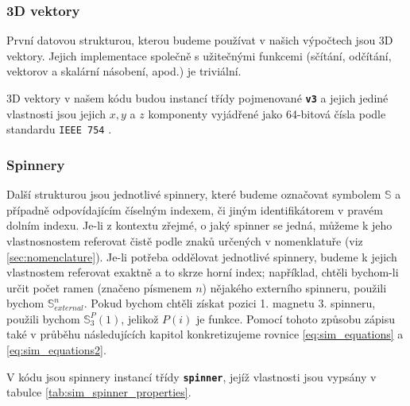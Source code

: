 \documentclass[12pt, a4paper,
 twoside,        %
 openright
]{report}
\begin{document}
\subsubsection{3D vektory}

První datovou strukturou, kterou budeme používat v našich výpočtech jsou 3D vektory. Jejich implementace společně s užitečnými funkcemi (sčítání, odčítání, vektorov a skalární násobení, apod.) je triviální.

3D vektory v našem kódu budou instancí třídy pojmenované \textbf{\texttt{v3}} a jejich jediné vlastnosti jsou jejich $x,y$ a $z$ komponenty vyjádřené jako 64-bitová čísla podle standardu \texttt{IEEE 754} \cite{IEEE-754}.

\subsubsection{Spinnery}

Další strukturou jsou jednotlivé spinnery, které budeme označovat symbolem $\mathbb{S}$ a případně odpovídajícím číselným indexem, či jiným identifikátorem v pravém dolním indexu. Je-li z kontextu zřejmé, o jaký spinner se jedná, můžeme k jeho vlastnosnostem referovat čistě podle znaků určených v nomenklatuře (viz \autoref{sec:nomenclature}). Je-li potřeba oddělovat jednotlivé spinnery, budeme k jejich vlastnostem referovat exaktně a to skrze horní index; například, chtěli bychom-li určit počet ramen (značeno písmenem $n$) nějakého externího spinneru, použili bychom $\mathbb{S}_{external}^{n}$. Pokud bychom chtěli získat pozici 1. magnetu 3. spinneru, použili bychom $\mathbb{S}_{3}^{P}(1)$, jelikož $P(i)$ je funkce. Pomocí tohoto způsobu zápisu také v průběhu následujících kapitol konkretizujeme rovnice \ref{eq:sim_equations} a \ref{eq:sim_equations2}.

V kódu jsou spinnery instancí třídy \textbf{\texttt{spinner}}, jejíž vlastnosti jsou vypsány v tabulce \ref{tab:sim_spinner_properties}.
\end{document}
